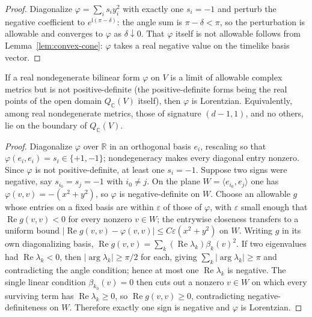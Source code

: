 \begin{proof}
  \leanok
  Diagonalize $\varphi = \sum_i s_i y_i^2$ with exactly one $s_i = -1$ and
  perturb the negative coefficient to $e^{\mathrm i (\pi - \delta)}$: the
  angle sum is $\pi - \delta < \pi$, so the perturbation is allowable and
  converges to $\varphi$ as $\delta \downarrow 0$. That $\varphi$ itself is
  not allowable follows from Lemma~\ref{lem:convex-cone}: $\varphi$ takes a
  real negative value on the timelike basis vector.
\end{proof}

\begin{proposition}
  \label{prop:only-lorentzian}
  \leanok
  If a real nondegenerate bilinear form $\varphi$ on $V$ is a limit of
  allowable complex metrics but is not positive-definite (the
  positive-definite forms being the real points of the open domain
  $Q_{\mathbb C}(V)$ itself), then $\varphi$ is Lorentzian. Equivalently,
  among real nondegenerate metrics, those of signature $(d-1,1)$, and no
  others, lie on the boundary of $Q_{\mathbb C}(V)$.
\end{proposition}

\begin{proof}
  \leanok
  Diagonalize $\varphi$ over $\mathbb R$ in an orthogonal basis $e_i$,
  rescaling so that $\varphi(e_i, e_i) = s_i \in \{+1, -1\}$; nondegeneracy
  makes every diagonal entry nonzero. Since $\varphi$ is not positive-definite,
  at least one $s_i = -1$. Suppose two signs were negative, say
  $s_{i_0} = s_j = -1$ with $i_0 \neq j$. On the plane
  $W = \langle e_{i_0}, e_j \rangle$ one has $\varphi(v, v) = -(x^2 + y^2)$,
  so $\varphi$ is negative-definite on $W$. Choose an allowable $g$ whose
  entries on a fixed basis are within $\varepsilon$ of those of $\varphi$,
  with $\varepsilon$ small enough that $\operatorname{Re} g(v, v) < 0$ for
  every nonzero $v \in W$; the entrywise closeness transfers to a uniform
  bound $|\operatorname{Re} g(v, v) - \varphi(v, v)| \le C \varepsilon
  (x^2 + y^2)$ on $W$. Writing $g$ in its own diagonalizing basis,
  $\operatorname{Re} g(v, v) = \sum_k (\operatorname{Re} \lambda_k)
  \beta_k(v)^2$. If two eigenvalues had $\operatorname{Re} \lambda_k < 0$,
  then $|\arg \lambda_k| \ge \pi/2$ for each, giving
  $\sum_k |\arg \lambda_k| \ge \pi$ and contradicting the angle condition;
  hence at most one $\operatorname{Re} \lambda_k$ is negative. The single
  linear condition $\beta_{k_0}(v) = 0$ then cuts out a nonzero $v \in W$ on
  which every surviving term has $\operatorname{Re} \lambda_k \ge 0$, so
  $\operatorname{Re} g(v, v) \ge 0$, contradicting negative-definiteness on
  $W$. Therefore exactly one sign is negative and $\varphi$ is Lorentzian.
\end{proof}

